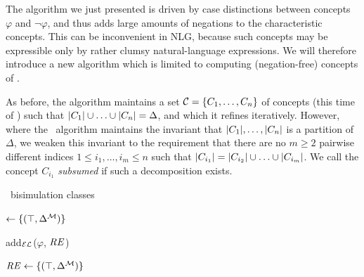The algorithm we just presented is driven by case distinctions between
concepts $\varphi$ and $\neg \varphi$, and thus adds large amounts of
negations to the characteristic concepts.  This can be inconvenient
in NLG, because such concepts may be expressible only by rather clumsy
natural-language expressions.   We will therefore
introduce a new algorithm which is limited to computing
(negation-free) concepts of \el.  

As before, the algorithm maintains a set $\mathcal{C} = \{C_1,\ldots,C_n\}$ of
concepts (this time of \el) such that $|C_1| \cup \ldots \cup
|C_n| = \Delta$, and which it refines iteratively.  However,
where the \alc\ algorithm maintains the invariant that
$|C_1|,\ldots,|C_n|$ is a partition of $\Delta$, we
weaken this invariant to the requirement that there are no $m \geq 2$
pairwise different indices $1 \leq i_1,\ldots,i_m \leq n$ such that
$|C_{i_1}| = |C_{i_2}| \cup \ldots \cup
|C_{i_m}|$.  We call the concept $C_{i_1}$ \emph{subsumed} if
such a decomposition exists.

\begin{algorithm}[t]
\dontprintsemicolon
\caption{\el\ bisimulation classes}
\label{algo:bisim-el}
\RE $\leftarrow \{(\top,\Delta^{\mathcal{M}})\}$ \;
\end{algorithm}


\begin{algorithm}[t]
\dontprintsemicolon
\caption{add$_\mathcal{EL}$($\varphi$, $\mathit{RE}$)}
\label{algo:bisim-add-el}
\end{algorithm}

\begin{algorithm}[t]
\dontprintsemicolon
\caption{}
\label{algo:bisim-alc}
$\mathit{RE} \leftarrow \{(\top,\Delta^{\mathcal{M}})\}$


 
\end{algorithm}

